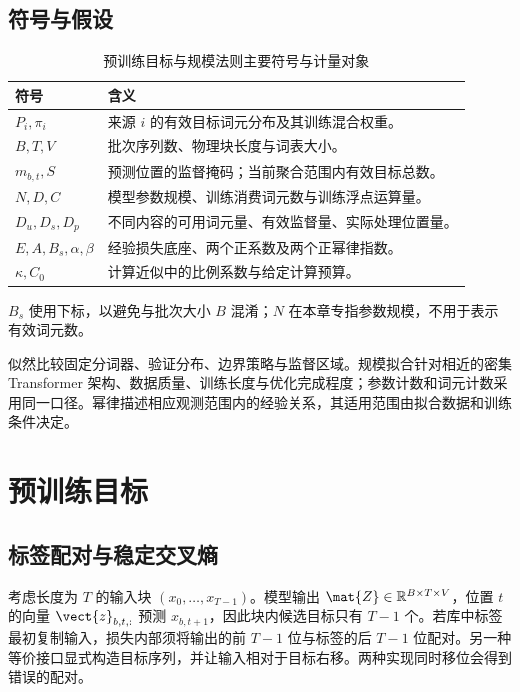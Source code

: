 \documentclass[../textbook.tex]{subfiles}
\begin{document}
\subsection{符号与假设}
\begin{table}[htbp]
\centering
\caption{预训练目标与规模法则主要符号与计量对象}
\label{tab:pretraining-symbols}
\begin{tabular}{ll}
\toprule 符号 & 含义\\\midrule
$P_i,\pi_i$ & 来源 $i$ 的有效目标词元分布及其训练混合权重。\\
$B,T,V$ & 批次序列数、物理块长度与词表大小。\\
$m_{b,t},S$ & 预测位置的监督掩码；当前聚合范围内有效目标总数。\\
$N,D,C$ & 模型参数规模、训练消费词元数与训练浮点运算量。\\
$D_u,D_s,D_p$ & 不同内容的可用词元量、有效监督量、实际处理位置量。\\
$E,A,B_s,\alpha,\beta$ & 经验损失底座、两个正系数及两个正幂律指数。\\
$\kappa,C_0$ & 计算近似中的比例系数与给定计算预算。\\
\bottomrule
\end{tabular}
\end{table}
$B_s$ 使用下标，以避免与批次大小 $B$ 混淆；$N$ 在本章专指参数规模，不用于表示有效词元数。

\begin{assumption}[预算模型的适用条件]
似然比较固定分词器、验证分布、边界策略与监督区域。规模拟合针对相近的密集 Transformer 架构、数据质量、训练长度与优化完成程度；参数计数和词元计数采用同一口径。幂律描述相应观测范围内的经验关系，其适用范围由拟合数据和训练条件决定。
\end{assumption}

\section{预训练目标}

\subsection{标签配对与稳定交叉熵}
考虑长度为 $T$ 的输入块 $(x_0,\ldots,x_{T-1})$。模型输出 $\mat{Z}\in\mathbb R^{B\times T\times V}$，位置 $t$ 的向量 $\vect{z}_{b,t,:}$ 预测 $x_{b,t+1}$，因此块内候选目标只有 $T-1$ 个。若库中标签最初复制输入，损失内部须将输出的前 $T-1$ 位与标签的后 $T-1$ 位配对。另一种等价接口显式构造目标序列，并让输入相对于目标右移。两种实现同时移位会得到错误的配对。
\end{document}
